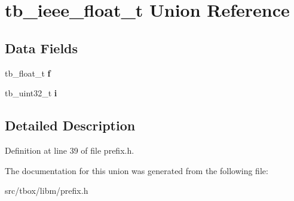 \hypertarget{uniontb__ieee__float__t}{\section{tb\-\_\-ieee\-\_\-float\-\_\-t Union Reference}
\label{uniontb__ieee__float__t}
}
\subsection*{Data Fields}
\begin{DoxyCompactItemize}
\item 
\hypertarget{uniontb__ieee__float__t_a27b330858e28d460f6d9147efef8fc8f}{tb\-\_\-float\-\_\-t {\bfseries f}}\label{uniontb__ieee__float__t_a27b330858e28d460f6d9147efef8fc8f}

\item 
\hypertarget{uniontb__ieee__float__t_a37e68fd8a2d937324d6bb042d254dc92}{tb\-\_\-uint32\-\_\-t {\bfseries i}}\label{uniontb__ieee__float__t_a37e68fd8a2d937324d6bb042d254dc92}

\end{DoxyCompactItemize}


\subsection{Detailed Description}


Definition at line 39 of file prefix.\-h.



The documentation for this union was generated from the following file\-:\begin{DoxyCompactItemize}
\item 
src/tbox/libm/prefix.\-h\end{DoxyCompactItemize}
